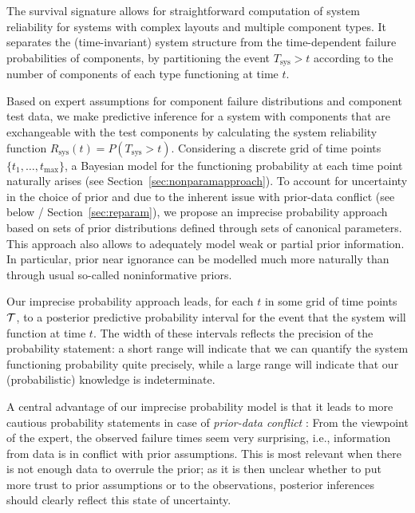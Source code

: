 \documentclass[12pt, a4paper]{elsarticle}
\newcommand{\Rsys}{R_\text{sys}}
\def\Tsys{T_\text{sys}}
\def\tmax{t_\text{max}}
\begin{document}
The survival signature allows for straightforward computation of system reliability
for systems with complex layouts and multiple component types.
It separates the (time-invariant) system structure from the time-dependent failure probabilities of components,
by partitioning the event $\Tsys > t$ according to the number of components of each type functioning at time $t$.

Based on expert assumptions for component failure distributions and component test data,
we make predictive inference for a system with components that are exchangeable
with the test components by calculating the system reliability function $\Rsys(t) = P(\Tsys > t)$.
Considering a discrete grid of time points $\{t_1, \ldots, \tmax\}$,
a Bayesian model for the functioning probability at each time point naturally arises (see Section~\ref{sec:nonparamapproach}).
To account for uncertainty in the choice of prior
and due to the inherent issue with prior-data conflict (see below / Section~\ref{sec:reparam}),
we propose an imprecise probability approach
based on sets of prior distributions defined through sets of canonical parameters.
This approach also allows to adequately model weak or partial prior information.
In particular, prior near ignorance can be modelled much more naturally than through usual so-called noninformative priors. 

Our imprecise probability approach leads, for each $t$ in some grid of time points ${\cal T}$,
to a posterior predictive probability interval for the event that the system will function at time $t$.
The width of these intervals reflects the precision of the probability statement:
a short range will indicate that we can quantify the system functioning probability quite precisely,
while a large range will indicate that our (probabilistic) knowledge is indeterminate.

A central advantage of our imprecise probability model is
that it leads to more cautious probability statements
in case of \emph{prior-data conflict} \cite[see, e.g.,][]{2006:evans}:
From the viewpoint of the expert, the observed failure times seem very surprising,
i.e., information from data is in conflict with prior assumptions.
This is most relevant when there is not enough data to overrule the prior;
as it is then unclear whether to put more trust to prior assumptions or to the observations,
posterior inferences should clearly reflect this state of uncertainty.
\end{document}
